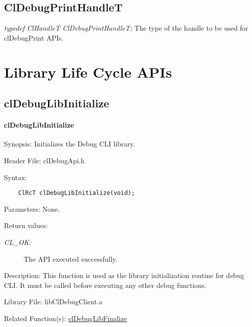 \subsection{ClDebugPrintHandleT}
\textit{typedef ClHandleT ClDebugPrintHandleT;}
\newline
\newline
The type of the handle to be used for clDebugPrint APIs.

\newpage

\section{Library Life Cycle APIs}
\subsection{clDebugLibInitialize}
\hypertarget{pagedbg102}{}\paragraph{cl\-Debug\-Lib\-Initialize}\label{pagedbg102}
\begin{Desc}
\item[Synopsis:]Initializes the Debug CLI library.\end{Desc}
\begin{Desc}
\item[Header File:]clDebugApi.h\end{Desc}
\begin{Desc}
\item[Syntax:]

\footnotesize\begin{verbatim}    ClRcT clDebugLibInitialize(void);
\end{verbatim}
\normalsize
\end{Desc}
\begin{Desc}
\item[Parameters:]None.\end{Desc}
\begin{Desc}
\item[Return values:]
\begin{description}
\item[{\em CL\_\-OK:}]The API executed successfully.\end{description}
\end{Desc}
\begin{Desc}
\item[Description:]This function is used as the library initialization routine for debug CLI. It must be called before executing any other debug functions.\end{Desc}
\begin{Desc}
\item[Library File:]lib\-Cl\-Debug\-Client.a\end{Desc}
\begin{Desc}
\item[Related Function(s):]\hyperlink{pagedbg103}{cl\-Debug\-Lib\-Finalize} \end{Desc}
\newpage


